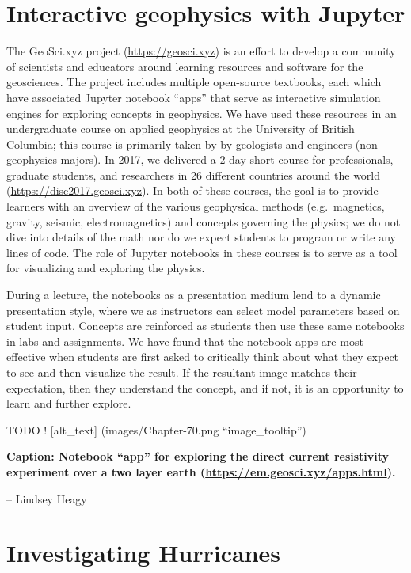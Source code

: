 \documentclass[]{book}
\begin{document}
\section{Interactive geophysics with
Jupyter}\label{interactive-geophysics-with-jupyter}

The GeoSci.xyz project (\url{https://geosci.xyz}) is an effort to
develop a community of scientists and educators around learning
resources and software for the geosciences. The project includes
multiple open-source textbooks, each which have associated Jupyter
notebook ``apps'' that serve as interactive simulation engines for
exploring concepts in geophysics. We have used these resources in an
undergraduate course on applied geophysics at the University of British
Columbia; this course is primarily taken by by geologists and engineers
(non-geophysics majors). In 2017, we delivered a 2 day short course for
professionals, graduate students, and researchers in 26 different
countries around the world (\url{https://disc2017.geosci.xyz}). In both
of these courses, the goal is to provide learners with an overview of
the various geophysical methods (e.g.~magnetics, gravity, seismic,
electromagnetics) and concepts governing the physics; we do not dive
into details of the math nor do we expect students to program or write
any lines of code. The role of Jupyter notebooks in these courses is to
serve as a tool for visualizing and exploring the physics.

During a lecture, the notebooks as a presentation medium lend to a
dynamic presentation style, where we as instructors can select model
parameters based on student input. Concepts are reinforced as students
then use these same notebooks in labs and assignments. We have found
that the notebook apps are most effective when students are first asked
to critically think about what they expect to see and then visualize the
result. If the resultant image matches their expectation, then they
understand the concept, and if not, it is an opportunity to learn and
further explore.

TODO ! {[}alt\_text{]} (images/Chapter-70.png ``image\_tooltip'')

\textbf{Caption: Notebook ``app'' for exploring the direct current
resistivity experiment over a two layer earth
(\url{https://em.geosci.xyz/apps.html}). }

-- Lindsey Heagy

\section{Investigating Hurricanes}\label{investigating-hurricanes}
\end{document}

